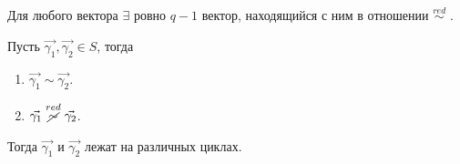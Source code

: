 Для любого вектора $\exists$ ровно $q-1$ вектор, находящийся с ним в отношении $\stackrel{red}{\sim}$ .

\thr
Пусть $\vec{\gamma_1}, \vec{\gamma_2} \in S$, тогда
\begin{enumerate}
    \item $\vec{\gamma_1} \sim \vec{\gamma_2}$.
    \item $\vec{\gamma_1} \stackrel{red}{\cancel{{\sim}}} \vec{\gamma_2}$.
\end{enumerate}

Тогда $\vec{\gamma_1}$ и $\vec{\gamma_2}$ лежат на различных циклах. 